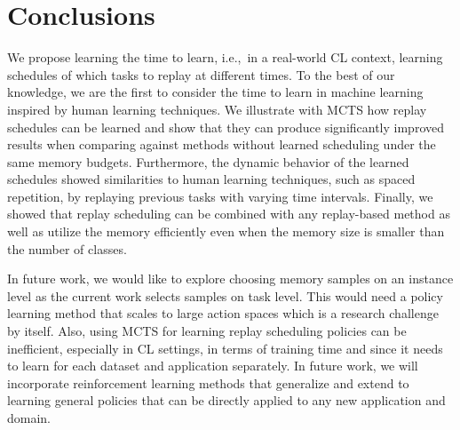 
\section{Conclusions}\label{paperC:sec:conclusions}

We propose learning the time to learn, i.e.,~in a real-world CL context, learning schedules of which tasks to replay at different times. %
To the best of our knowledge, we are the first to consider the time to learn in machine learning inspired by human learning techniques. 
We illustrate with MCTS how replay schedules can be learned and show that they can produce significantly improved results when comparing against methods without learned scheduling under the same memory budgets.
Furthermore, the dynamic behavior of the learned schedules showed similarities to human learning techniques, such as spaced repetition, by replaying previous tasks with varying time intervals.  
Finally, we showed that replay scheduling can be combined with any replay-based method as well as utilize the memory efficiently even when the memory size is smaller than the number of classes. %


In future work, we would like to explore choosing memory samples on an instance level as the current work selects samples on task level. 
This would need a policy learning method that scales to large action spaces which is a research challenge by itself. 
Also, using MCTS for learning replay scheduling policies can be inefficient, %
especially in CL settings, 
in terms of training time and since it needs to learn for each dataset and application separately. 
In future work, we will incorporate reinforcement learning methods that generalize and extend to learning general policies that can be directly applied to any new application and domain.

